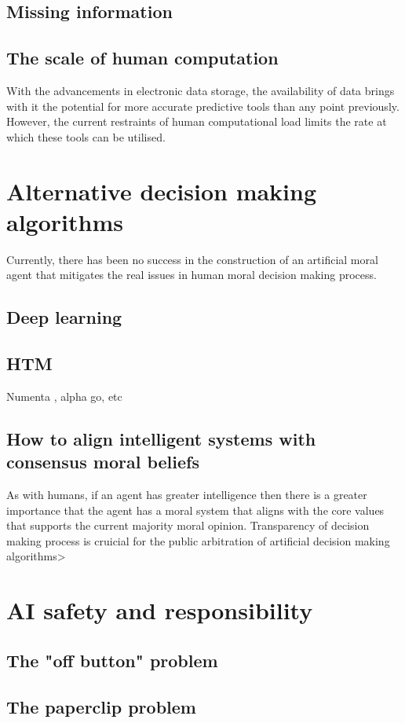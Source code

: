 \subsection{Missing information}
\subsection{The scale of human computation}
With the advancements in electronic data storage, the availability of data brings with it the potential for more accurate predictive tools than any point previously.
However, the current restraints of human computational load limits the rate at which these tools can be utilised.

\section{Alternative decision making algorithms}
Currently, there has been no success in the construction of an artificial moral agent that mitigates the real issues in human moral decision making process.
\subsection{Deep learning}
\subsection{HTM}
Numenta \cite{numentahome}, alpha go, etc
\subsection{How to align intelligent systems with consensus moral beliefs}
As with humans, if an agent has greater intelligence then there is a greater importance that the agent has a moral system that aligns with the core values that supports the current majority moral opinion.
Transparency of decision making process is cruicial for the public arbitration of artificial decision making algorithms>

\section{AI safety and responsibility}
\subsection{The "off button" problem}
\subsection{The paperclip problem}

